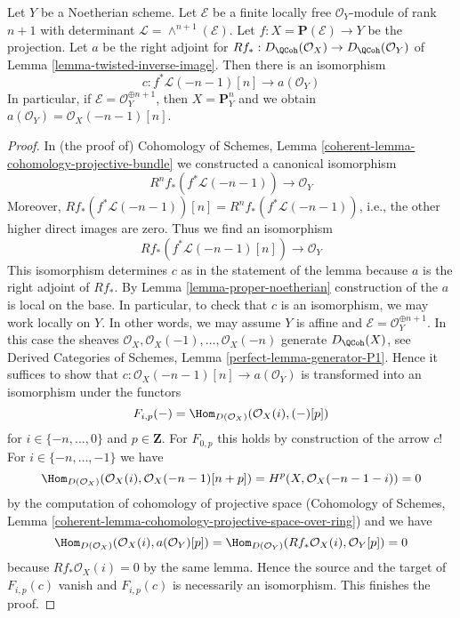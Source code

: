 \begin{lemma}
\label{lemma-upper-shriek-P1}
Let $Y$ be a Noetherian scheme. Let $\mathcal{E}$ be a finite locally
free $\mathcal{O}_Y$-module of rank $n + 1$ with determinant
$\mathcal{L} = \wedge^{n + 1}(\mathcal{E})$.
Let $f : X = \mathbf{P}(\mathcal{E}) \to Y$ be the projection.
Let $a$ be the right adjoint for
$Rf_* : D_\QCoh(\mathcal{O}_X) \to D_\QCoh(\mathcal{O}_Y)$ of
Lemma \ref{lemma-twisted-inverse-image}.
Then there is an isomorphism
$$
c : f^*\mathcal{L}(-n - 1)[n] \longrightarrow a(\mathcal{O}_Y)
$$
In particular, if $\mathcal{E} = \mathcal{O}_Y^{\oplus n + 1}$, then
$X = \mathbf{P}^n_Y$ and we obtain
$a(\mathcal{O}_Y) = \mathcal{O}_X(-n - 1)[n]$.
\end{lemma}

\begin{proof}
In (the proof of) Cohomology of Schemes, Lemma
\ref{coherent-lemma-cohomology-projective-bundle}
we constructed a canonical isomorphism
$$
R^nf_*(f^*\mathcal{L}(-n - 1)) \longrightarrow \mathcal{O}_Y
$$
Moreover, $Rf_*(f^*\mathcal{L}(-n - 1))[n] = R^nf_*(f^*\mathcal{L}(-n - 1))$,
i.e., the other higher direct images are zero. Thus we find an isomorphism
$$
Rf_*(f^*\mathcal{L}(-n - 1)[n]) \longrightarrow \mathcal{O}_Y
$$
This isomorphism determines $c$ as in the statement of the lemma
because $a$ is the right adjoint of $Rf_*$.
By Lemma \ref{lemma-proper-noetherian} construction of the $a$
is local on the base. In particular, to check that
$c$ is an isomorphism, we may work locally on $Y$.
In other words, we may assume $Y$ is affine and
$\mathcal{E} = \mathcal{O}_Y^{\oplus n + 1}$.
In this case the sheaves $\mathcal{O}_X, \mathcal{O}_X(-1), \ldots,
\mathcal{O}_X(-n)$ generate $D_\QCoh(X)$, see
Derived Categories of Schemes, Lemma \ref{perfect-lemma-generator-P1}.
Hence it suffices to show that
$c : \mathcal{O}_X(-n - 1)[n] \to a(\mathcal{O}_Y)$
is transformed into an isomorphism under the functors
$$
F_{i, p}(-) = \Hom_{D(\mathcal{O}_X)}(\mathcal{O}_X(i), (-)[p])
$$
for $i \in \{-n, \ldots, 0\}$ and $p \in \mathbf{Z}$.
For $F_{0, p}$ this holds by construction of the arrow $c$!
For $i \in \{-n, \ldots, -1\}$ we have
$$
\Hom_{D(\mathcal{O}_X)}(\mathcal{O}_X(i), \mathcal{O}_X(-n - 1)[n + p]) =
H^p(X, \mathcal{O}_X(-n - 1 - i)) = 0
$$
by the computation of cohomology of projective space
(Cohomology of Schemes, Lemma
\ref{coherent-lemma-cohomology-projective-space-over-ring})
and we have
$$
\Hom_{D(\mathcal{O}_X)}(\mathcal{O}_X(i), a(\mathcal{O}_Y)[p]) =
\Hom_{D(\mathcal{O}_Y)}(Rf_*\mathcal{O}_X(i), \mathcal{O}_Y[p]) = 0
$$
because $Rf_*\mathcal{O}_X(i) = 0$ by the same lemma.
Hence the source and the target of $F_{i, p}(c)$ vanish
and $F_{i, p}(c)$ is necessarily an isomorphism.
This finishes the proof.
\end{proof}

